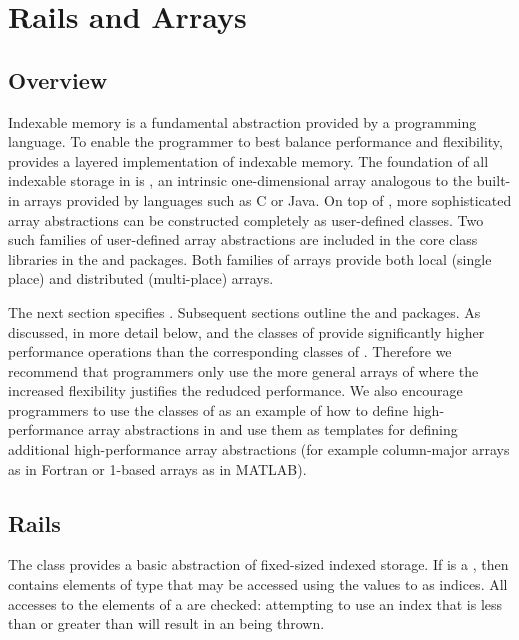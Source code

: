 \chapter{Rails and Arrays}\label{XtenArrays}

\section{Overview}

Indexable memory is a fundamental abstraction provided by a
programming language. To enable the programmer to best balance
performance and flexibility, \Xten{} provides a layered implementation
of indexable memory. The foundation of all indexable storage in
\Xten{} is , an intrinsic one-dimensional array
analogous to the built-in arrays provided by languages such as C or
Java. On top of , more sophisticated array abstractions can
be constructed completely as user-defined \Xten{} classes. Two such
families of user-defined array abstractions are included in the
\Xten{} core class libraries in the  and
 packages.  Both families of arrays provide both
local (single place) and distributed (multi-place) arrays.

The next section specifies .  Subsequent sections outline
the  and  packages.  As discussed,
in more detail below,  and the classes of 
provide significantly higher performance operations than the
corresponding classes of . Therefore we recommend
that programmers only use the more general arrays of
 where the increased flexibility justifies the
redudced performance. We also encourage programmers to use the classes
of  as an example of how to define high-performance
array abstractions in \Xten{} and use them as templates for defining
additional high-performance array abstractions (for example
column-major arrays as in Fortran or 1-based arrays as in MATLAB).

\section{Rails}\label{XtenRails}

The  class provides a basic abstraction of fixed-sized
indexed storage.  If  is a , then  contains
 elements of type  that may be accessed using the
 values  to  as indices.  All accesses
to the elements of a  are checked: attempting to use an
index that is less than  or greater than  will
result in an  being thrown.

